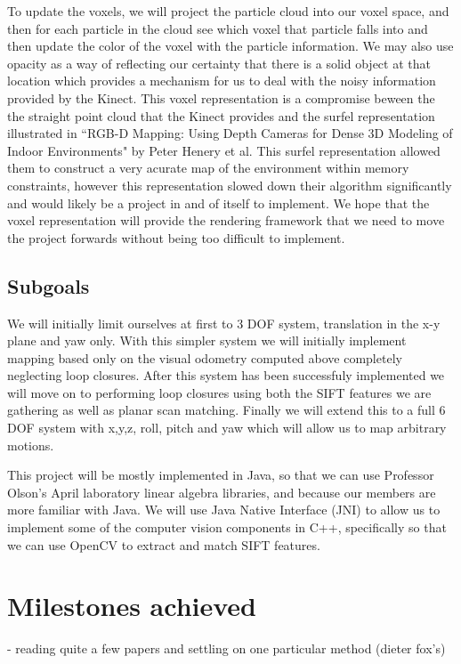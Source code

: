 \documentclass[12pt]{article}
\begin{document}
To update the voxels, we will project the particle cloud into our voxel space, and then for each particle in the cloud see which voxel that particle falls into and then update the color of the voxel with the particle information.  We may also use opacity as a way of reflecting our certainty that there is a solid object at that location which provides a mechanism for us to deal with the noisy information provided by the Kinect.  This voxel representation is a compromise beween the the straight point cloud that the Kinect provides and the surfel representation illustrated in ``RGB-D Mapping: Using Depth Cameras for Dense 3D Modeling of Indoor Environments" by Peter Henery et al. This surfel representation allowed them to construct a very acurate map of the environment within memory constraints, however this representation slowed down their algorithm significantly and would likely be a project in and of itself to implement.  We hope that the voxel representation will provide the rendering framework that we need to move the project forwards without being too difficult to implement.

\subsection{Subgoals}


We will initially limit ourselves at first to 3 DOF system, translation in the x-y plane and yaw only.  With this simpler system we will initially implement mapping based only on the visual odometry computed above completely neglecting loop closures.  After this system has been successfuly implemented we will move on to performing loop closures using both the SIFT features we are gathering as well as planar scan matching.  Finally we will extend this to a full 6 DOF system with x,y,z, roll, pitch and yaw which will allow us to map arbitrary motions.  

This project will be mostly implemented in Java, so that we can use Professor Olson's April laboratory linear algebra libraries, and because our members are more familiar with Java.  We will use Java Native Interface (JNI) to allow us to implement some of the computer vision components in C++, specifically so that we can use OpenCV to extract and match SIFT features. 


\section{Milestones achieved}
- reading quite a few papers and settling on one particular method (dieter fox's)
\end{document}
